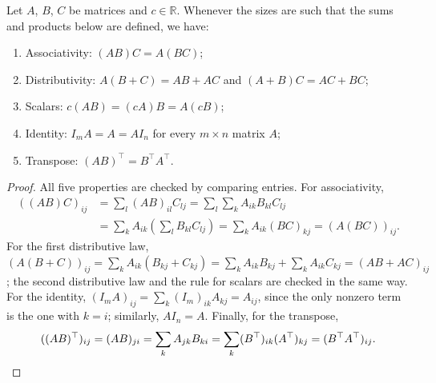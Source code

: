 \begin{proposition}\label{L1-prop:mult-props}
    Let $A$, $B$, $C$ be matrices and $c \in \mathbb{R}$. Whenever the sizes are such that the sums and products below are defined, we have:
    \begin{enumerate}
        \item Associativity: $(AB)C = A(BC)$;
        \item Distributivity: $A(B + C) = AB + AC$ and $(A + B)C = AC + BC$;
        \item Scalars: $c(AB) = (cA)B = A(cB)$;
        \item Identity: $I_m A = A = A I_n$ for every $m \times n$ matrix $A$;
        \item Transpose: $(AB)^\top = B^\top A^\top$.
    \end{enumerate}
\end{proposition}

\begin{proof}
    All five properties are checked by comparing entries. For associativity,
    \begin{align*}
        ((AB)C)_{ij} &= \sum_{l} (AB)_{il} C_{lj} = \sum_{l} \sum_{k} A_{ik} B_{kl} C_{lj} \\
        &= \sum_{k} A_{ik} \left(\sum_{l} B_{kl} C_{lj}\right) = \sum_{k} A_{ik} (BC)_{kj} = (A(BC))_{ij}.
    \end{align*}
    For the first distributive law, $(A(B + C))_{ij} = \sum_k A_{ik}(B_{kj} + C_{kj}) = \sum_k A_{ik} B_{kj} + \sum_k A_{ik} C_{kj} = (AB + AC)_{ij}$; the second distributive law and the rule for scalars are checked in the same way. For the identity, $(I_m A)_{ij} = \sum_k (I_m)_{ik} A_{kj} = A_{ij}$, since the only nonzero term is the one with $k = i$; similarly, $A I_n = A$. Finally, for the transpose,
    \[((AB)^\top)_{ij} = (AB)_{ji} = \sum_k A_{jk} B_{ki} = \sum_k (B^\top)_{ik} (A^\top)_{kj} = (B^\top A^\top)_{ij}. \qedhere\]
\end{proof}

